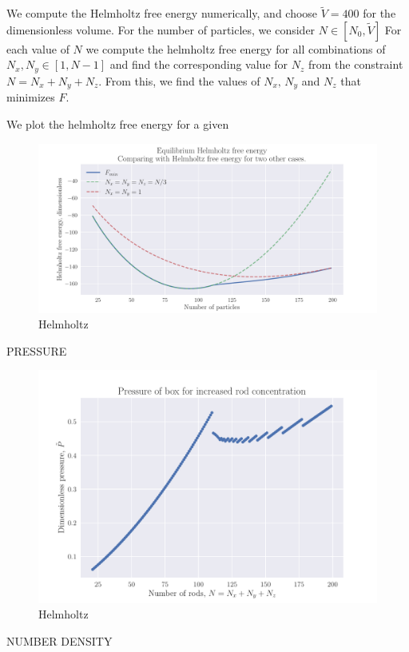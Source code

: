\documentclass[reprint,english,notitlepage,aps,nobalancelastpage,nofootinbib]{revtex4-1}
\newcommand{\nx}{N_x}
\newcommand{\ny}{N_y}
\newcommand{\nz}{N_z}
\newcommand{\V}{\tilde{V}}
\begin{document}
We compute the Helmholtz free energy numerically, and choose $\V=400$ for the dimensionless volume. For the number of particles, we consider $N\in[N_0,\V]$ 
For each value of $N$ we compute the helmholtz free energy for all combinations of $\nx,\ny\in[1,N-1]$ and find the corresponding value for $\nz$ from the constraint $N=\nx+\ny+\nz$. From this, we find the values of $\nx,\,\ny$ and $\nz$ that minimizes $F$. 

We plot the helmholtz free energy for a given 

\begin{figure}[h!]
	\centering
	\includegraphics[width=0.8\linewidth]{helmholtz_free_energy.pdf}
	\caption{Helmholtz}
	\label{fig:F}
\end{figure}


PRESSURE 


\begin{figure}[h!]
	\centering
	\includegraphics[width=0.8\linewidth]{helmholtz_pressure.pdf}
	\caption{Helmholtz}
	\label{fig:F_P}
\end{figure}


NUMBER DENSITY 
\end{document}
